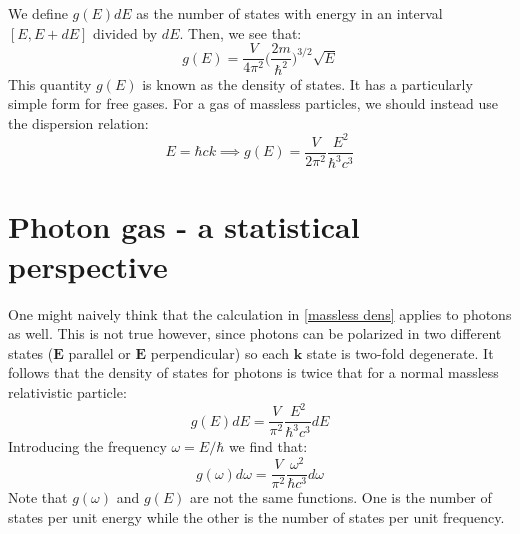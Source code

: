 \documentclass[a4paper,11pt,oneside]{book}
\begin{document}
We define $g(E) dE$ as the number of states with energy in an interval $[E,E+dE]$ divided by $dE$. Then, we see that:
\begin{equation}
    g(E) = \frac{V}{4\pi^2}\bigg(\frac{2m}{\hbar^2}\bigg)^{3/2}\sqrt{E}
\end{equation}
This quantity $g(E)$ is known as the density of states. It has a particularly simple form for free gases. For a gas of massless particles, we should instead use the dispersion relation:
\begin{equation}\label{massless dens}
    E=\hbar c k \implies g(E) = \frac{V}{2\pi^2} \frac{E^2}{\hbar^3 c^3}
\end{equation}
\section{Photon gas - a statistical perspective}
One might naively think that the calculation in \eqref{massless dens} applies to photons as well. This is not true however, since photons can be polarized in two different states ($\textbf{E}$ parallel or $\textbf{E}$ perpendicular) so each $\textbf{k}$ state is two-fold degenerate. It follows that the density of states for photons is twice that for a normal massless relativistic particle:
\begin{equation}
    g(E)dE = \frac{V}{\pi^2} \frac{E^2}{\hbar^3 c^3}dE
\end{equation}
Introducing the frequency $\omega = E/\hbar$ we find that:
\begin{equation}
    \boxed{g(\omega) d\omega = \frac{V}{\pi^2}\frac{\omega^2}{\hbar c^3}d\omega}
\end{equation}
Note that $g(\omega)$ and $g(E)$ are not the same functions. One is the number of states per unit energy while the other is the number of states per unit frequency. 
\end{document}
